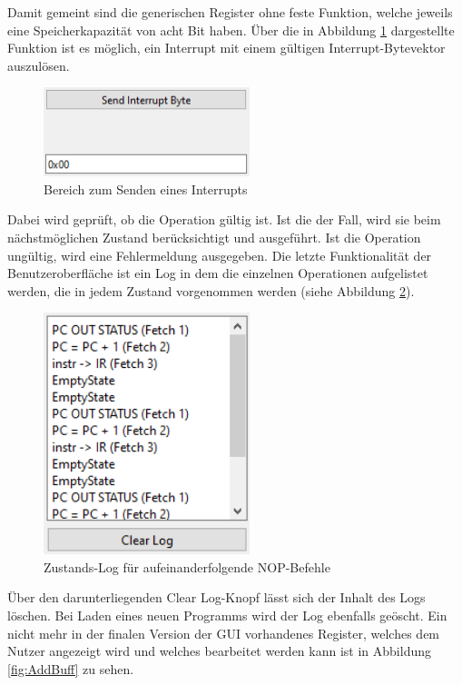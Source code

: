 \documentclass[12pt]{article}
\newcommand{\imgSpaceBefore}{\vspace{10pt}}
\begin{document}
\noindent
Damit gemeint sind die generischen Register ohne feste Funktion, welche jeweils eine Speicherkapazität von acht Bit haben. Über die in Abbildung \ref{fig:Interrupt} dargestellte Funktion ist es möglich, ein Interrupt mit einem gültigen Interrupt-Bytevektor auszulösen.\imgSpaceBefore

\begin{figure}[h]
\centering
\includegraphics[width=6cm]{bilder/Interrupt}
\caption{Bereich zum Senden eines Interrupts}
\label{fig:Interrupt}
\end{figure}

\noindent
Dabei wird geprüft, ob die Operation gültig ist. Ist die der Fall, wird sie beim nächstmöglichen Zustand berücksichtigt und ausgeführt. Ist die Operation ungültig, wird eine Fehlermeldung ausgegeben.
\newpage
\noindent
Die letzte Funktionalität der Benutzeroberfläche ist ein Log in dem die einzelnen Operationen aufgelistet werden, die in jedem Zustand vorgenommen werden (siehe Abbildung \ref{fig:Logger}).\imgSpaceBefore

\begin{figure}[h]
\centering
\includegraphics[width=6cm]{bilder/Logger}
\caption{Zustands-Log für aufeinanderfolgende NOP-Befehle}
\label{fig:Logger}
\end{figure}

\noindent
Über den darunterliegenden \glqq Clear Log\grqq-Knopf lässt sich der Inhalt des Logs löschen. Bei Laden eines neuen Programms wird der Log ebenfalls geöscht. Ein nicht mehr in der finalen Version der GUI vorhandenes Register, welches dem Nutzer angezeigt wird und welches bearbeitet werden kann ist in Abbildung \ref{fig:AddBuff} zu sehen.\imgSpaceBefore
\end{document}

